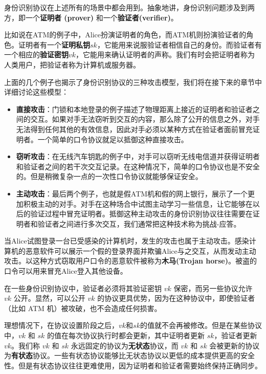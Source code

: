 \begin{snote}
身份识别协议在上述所有的场景中都会用到。抽象地讲，身份识别问题涉及到两方，即一个\textbf{证明者 (prover)} 和一个\textbf{验证者(verifier)}。

比如说在ATM的例子中，Alice扮演证明者的角色，而ATM机则扮演验证者的角色。证明者有一个\textbf{证明私钥}$sk$，它能用来说服验证者相信自己的身份。而验证者有一个相应的\textbf{验证密钥}$vk$，它能用来确认证明者的声称。我们有时会把证明者称为人类用户，把验证者称为计算机或服务器。

上面的几个例子也揭示了身份识别协议的三种攻击模型，我们将在接下来的章节中详细讨论这些模型：

\begin{itemize}
    \item \textbf{直接攻击}：门锁和本地登录的例子描述了物理距离上接近的证明者和验证者之间的交互。如果对手无法窃听到交互的内容，那么除了公开的信息之外，对手无法得到任何其他的有效信息，因此对手必须以某种方式在验证者面前冒充证明者。一个简单的口令协议就足以抵御这种直接攻击。
    \item \textbf{窃听攻击}：在无线汽车钥匙的例子中，对手可以窃听无线电信道并获得证明者和验证者之间的若干次交互记录。在这种情况下，简单的口令协议也是不安全的。但是稍微复杂一点的一次性口令协议就能够保证安全。
    \item \textbf{主动攻击}：最后两个例子，也就是假ATM机和假的网上银行，展示了一个更加积极主动的对手。对手在这种场合中试图主动学习一些信息，让它能够在以后的验证过程中冒充证明者。抵御这种主动攻击的身份识别协议往往需要在证明者和验证者之间进行多次交互，我们通常把这种技术称为挑战-应答。
\end{itemize}

当Alice试图登录一台已受感染的计算机时，发生的攻击也属于主动攻击。感染计算机的恶意软件可以展示一个假的登录界面并欺骗Alice与之交互，从而发动主动攻击。以这种方式窃取用户口令的恶意软件被称为\textbf{木马(Trojan horse)}。被盗的口令可以用来冒充Alice登入其他设备。	
\end{snote}

\begin{snote}[验证密钥的保密与公开.]
在一些身份识别协议中，验证者必须将其验证密钥 $vk$ 保密，而另一些协议允许 $vk$ 公开。显然，可以公开 $vk$ 的协议更具优势，因为在这种协议中，即使验证者（比如 ATM 机）被攻破，也不会造成任何损害。
\end{snote}

\begin{snote}[无状态协议与有状态协议.]
理想情况下，在协议设置阶段之后，$vk$和$sk$的值就不会再被修改。但是在某些协议中，$vk$ 和 $sk$ 的值在每次协议执行时都会更新，其中证明者更新 $sk$，验证者更新 $vk$。我们称 $vk$ 和 $sk$ 永远固定的协议为\textbf{无状态}协议，而 $vk$ 和 $sk$ 会被更新的协议为\textbf{有状态}协议。一些有状态协议能够比无状态协议以更低的成本提供更高的安全性。但是有状态协议往往更难使用，因为证明者和验证者需要始终保持正确同步。
\end{snote}

